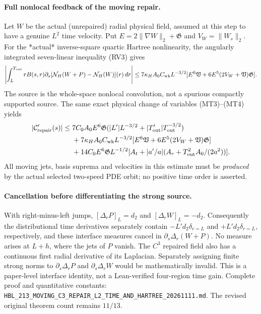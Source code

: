 \paragraph{Full nonlocal feedback of the moving repair.}
Let $W$ be the actual (unrepaired) radial physical field,
assumed at this step to have a genuine $L^2$ time velocity.
Put $E=2\|\nabla W\|_2+\mathfrak G$ and
$V_W=\|W_s\|_2$. For the *actual* inverse-square quartic
Hartree nonlinearity, the angularly integrated seven-linear
inequality (RV3) gives
\[
\begin{aligned}
\left|\int_L^{T_{\rm out}}rB(s,r)\partial_s
 [\mathcal N_H(W+P)-\mathcal N_H(W)](r)\,dr\right|
 \le 7\kappa_HA_0C_{\rm wk}L^{-3/2}
 [E^6\mathfrak V+6E^5(2V_W+\mathfrak V)\mathfrak G].
\end{aligned}
\]
The source is the whole-space nonlocal convolution, not a
spurious compactly supported source. The same exact physical
change of variables (MT3)--(MT4) yields
\[
\begin{aligned}
|\mathcal C_{\rm repair}'(s)|\le{}&
7C_0A_0E^6\mathfrak G
 (|L'|L^{-3/2}+|T_{\rm out}'|T_{\rm out}^{-3/2})\\
&+7\kappa_HA_0C_{\rm wk}L^{-3/2}
 [E^6\mathfrak V+6E^5(2V_W+\mathfrak V)\mathfrak G]\\
&+14C_0E^6\mathfrak G L^{-1/2}
 [A_t+|a'/a|(A_r+T_{\rm out}^2A_0/(2a^2))].
\end{aligned}
\]
All moving jets, basis suprema and velocities in this estimate
must be \emph{produced} by the actual selected two-speed PDE orbit;
no positive time order is asserted.

\paragraph{Cancellation before differentiating the strong source.}
With right-minus-left jumps,
$[\Delta_rP]_L=d_2$ and $[\Delta_rW]_L=-d_2$.
Consequently the distributional time derivatives separately
contain $-L'd_2\delta_{r=L}$ and $+L'd_2\delta_{r=L}$,
respectively, and these interface measures cancel in
$\partial_s\Delta_r(W+P)$.
No measure arises at $L+h$, where the jets of $P$ vanish.
The $C^3$ repaired field also has a continuous first radial
derivative of its Laplacian. Separately assigning finite strong
norms to $\partial_s\Delta_rP$ and $\partial_s\Delta_rW$
would be mathematically invalid. This is a paper-level interface
identity, not a Lean-verified four-region time gain. Complete
proof and quantitative constants:
\texttt{HBL\_213\_MOVING\_C3\_REPAIR\_L2\_TIME\_AND\_HARTREE\_20261111.md}.
The revised original theorem count remains $11/13$.
